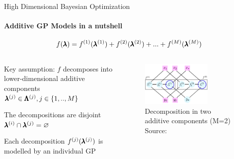 \begin{frame}[c]{High Dimensional Bayesian Optimization}
\framesubtitle{Additive GP Models in a nutshell}
        \begin{equation*}
            f(\pmb{\lambda})=f^{(1)}(\pmb{\lambda}^{(1)})+f^{(2)}(\pmb{\lambda}^{(2)})+...+f^{(M)}(\pmb{\lambda}^{(M)})
        \end{equation*}
\begin{itemize}
\begin{columns}[T]
\begin{column}{0.45\linewidth}

\hspace{2em}
    \item Key assumption: $f$ decomposes into lower-dimensional additive components $\pmb{\lambda}^{(j)} \in \pmb{\Lambda}^{(j)}, j \in \{1,..,M\}$
    \item The decompositions are disjoint $\pmb{\lambda}^{(i)} \cap \pmb{\lambda}^{(j)} = \varnothing$
    \pause
    \item Each decomposition $f^{(j)}(\pmb{\lambda}^{(j)})$ is modelled by an individual GP
    \pause
    \end{column}
    \begin{column}{0.45\linewidth}
        \begin{figure}
    \includegraphics[width=0.7\textwidth]{images/highdim_images/additive-models.png}
    \caption{Decomposition in two additive components (M=2) \\ Source: }
    \end{figure}
    \end{column}
\end{columns}
\end{itemize}
\end{frame}
